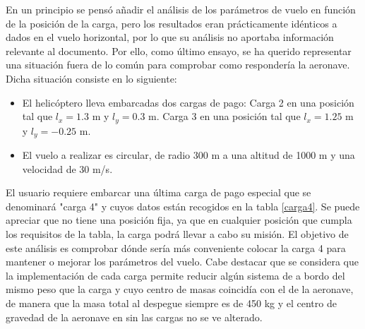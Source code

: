 En un principio se pensó añadir el análisis de los parámetros de vuelo en función de la posición de la carga, pero los resultados eran prácticamente idénticos a dados en el vuelo horizontal, por lo que su análisis no aportaba información relevante  al documento.
Por ello, como último ensayo, se ha querido representar una situación fuera de lo común para comprobar como respondería la aeronave. Dicha situación consiste en lo siguiente:

\begin{itemize}
	\item El helicóptero lleva embarcadas dos cargas de pago:
	\subitem Carga 2 en una posición tal que $l_x=1.3$ m y $l_y=0.3$ m.
	\subitem Carga 3 en una posición tal que $l_x=1.25$ m y $l_y=-0.25$ m.
	\item El vuelo a realizar es circular, de radio 300 m a una altitud de 1000 m y una velocidad de 30 m/s.
\end{itemize}
El usuario requiere embarcar una última carga de pago especial que se denominará "carga 4" y cuyos datos están recogidos en la tabla \ref{carga4}. Se puede apreciar que no tiene una posición fija, ya que en cualquier posición que cumpla los requisitos de la tabla, la carga podrá llevar a cabo su misión.
El objetivo de este análisis es comprobar dónde sería más conveniente colocar la carga 4 para mantener o mejorar los parámetros del vuelo.
Cabe destacar que se considera que la implementación de cada carga permite reducir algún sistema de a bordo del mismo peso que la carga y cuyo centro de masas coincidía con el de la aeronave, de manera que la masa total al despegue siempre es de 450 kg y el centro de gravedad de la aeronave en sin las cargas no se ve alterado.

